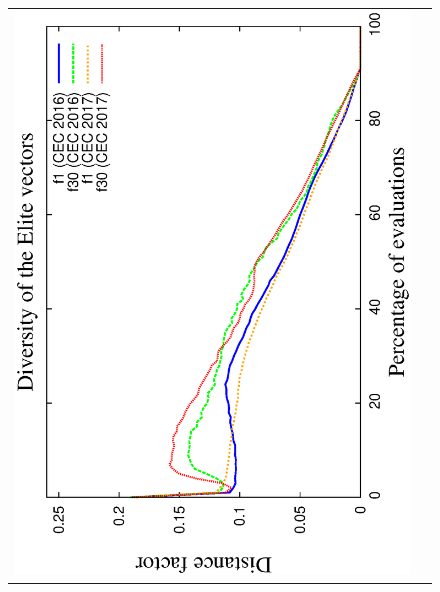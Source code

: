 \begin{figure}[!t]
\centering
\begin{tabular}{cc}
   \includegraphics[scale=0.23, angle=-90]{img/ED/Diversity_Elite.eps} 

\end{tabular}
\end{figure}
